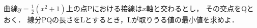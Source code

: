 \documentclass[../../main.tex]{subfiles}
\begin{document}
曲線$\displaystyle y=\frac{1}{2}(x^2+1)$上の点Pにおける接線は$x$軸と交わるとし，
その交点をQとおく．
線分PQの長さをLとするとき，Lが取りうる値の最小値を求めよ．
\end{document}
